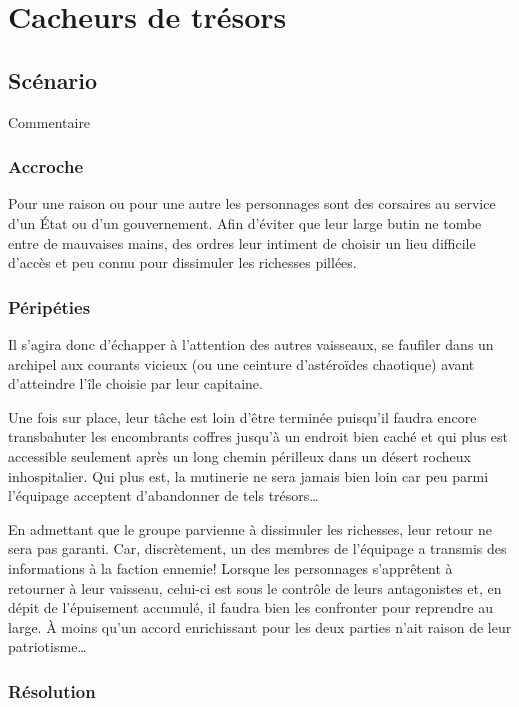 \chapter{Cacheurs de trésors}

\section{Scénario}

Commentaire

\subsection{Accroche}

Pour une raison ou pour une autre les personnages sont des corsaires au service d'un État ou d'un gouvernement.
Afin d'éviter que leur large butin ne tombe entre de mauvaises mains, des ordres leur intiment de choisir un lieu difficile d'accès et peu connu pour dissimuler les richesses pillées.

\subsection{Péripéties}

Il s'agira donc d'échapper à l'attention des autres vaisseaux, se faufiler dans un archipel aux courants vicieux (ou une ceinture d'astéroïdes chaotique) avant d'atteindre l'île choisie par leur capitaine.

Une fois sur place, leur tâche est loin d'être terminée puisqu'il faudra encore transbahuter les encombrants coffres jusqu'à un endroit bien caché et qui plus est accessible seulement après un long chemin périlleux dans un désert rocheux inhospitalier.
Qui plus est, la mutinerie ne sera jamais bien loin car peu parmi l'équipage acceptent d'abandonner de tels trésors\dots

En admettant que le groupe parvienne à dissimuler les richesses, leur retour ne sera pas garanti.
Car, discrètement, un des membres de l'équipage a transmis des informations à la faction ennemie!
Lorsque les personnages s'apprêtent à retourner à leur vaisseau, celui-ci est sous le contrôle de leurs antagonistes et, en dépit de l'épuisement accumulé, il faudra bien les confronter pour reprendre au large.
À moins qu'un accord enrichissant pour les deux parties n'ait raison de leur patriotisme\dots

\subsection{Résolution}

